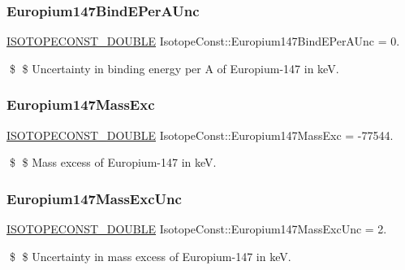 \subsubsection{\texorpdfstring{Europium147\+Bind\+E\+Per\+A\+Unc}{Europium147BindEPerAUnc}}
{\footnotesize\ttfamily \mbox{\hyperlink{group___isotope_const-_macros_ga8f45a7272ce02c0b4c65c44636ed719a}{I\+S\+O\+T\+O\+P\+E\+C\+O\+N\+S\+T\+\_\+\+D\+O\+U\+B\+LE}} Isotope\+Const\+::\+Europium147\+Bind\+E\+Per\+A\+Unc = 0.}

\$ \$ Uncertainty in binding energy per A of Europium-\/147 in keV. \mbox{\label{group___isotope_const-_europium-_eu147_ga2b21fbf4d424f1577ba0cf3d75c1f317}} 
\subsubsection{\texorpdfstring{Europium147\+Mass\+Exc}{Europium147MassExc}}
{\footnotesize\ttfamily \mbox{\hyperlink{group___isotope_const-_macros_ga8f45a7272ce02c0b4c65c44636ed719a}{I\+S\+O\+T\+O\+P\+E\+C\+O\+N\+S\+T\+\_\+\+D\+O\+U\+B\+LE}} Isotope\+Const\+::\+Europium147\+Mass\+Exc = -\/77544.}

\$ \$ Mass excess of Europium-\/147 in keV. \mbox{\label{group___isotope_const-_europium-_eu147_gac4b32387993d3f8b92558843379fac7d}} 
\subsubsection{\texorpdfstring{Europium147\+Mass\+Exc\+Unc}{Europium147MassExcUnc}}
{\footnotesize\ttfamily \mbox{\hyperlink{group___isotope_const-_macros_ga8f45a7272ce02c0b4c65c44636ed719a}{I\+S\+O\+T\+O\+P\+E\+C\+O\+N\+S\+T\+\_\+\+D\+O\+U\+B\+LE}} Isotope\+Const\+::\+Europium147\+Mass\+Exc\+Unc = 2.}

\$ \$ Uncertainty in mass excess of Europium-\/147 in keV. \mbox{\label{group___isotope_const-_europium-_eu147_gaa9577646749a90b6e47fda50b1102d44}} 
